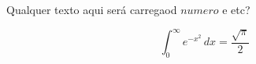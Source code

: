 Qualquer texto aqui será carregaod $numero$ e etc?

\[
  \int_{0}^{\infty} e^{-x^2} \, dx = \frac{\sqrt{\pi}}{2}
\]
